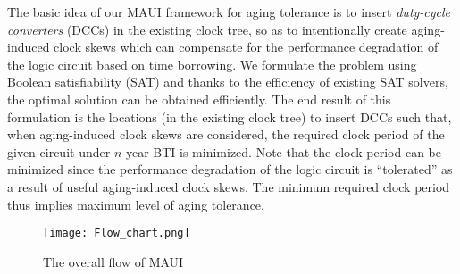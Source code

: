 The basic idea of our MAUI framework for aging tolerance is to insert \textit{duty-cycle converters} (DCCs) in the existing clock tree, so as to intentionally create aging-induced clock skews which can compensate for the performance degradation of the logic circuit based on time borrowing. We formulate the problem using Boolean satisfiability (SAT) and thanks to the efficiency of existing SAT solvers, the optimal solution can be obtained efficiently. The end result of this formulation is the locations (in the existing clock tree) to insert DCCs such that, when aging-induced clock skews are considered, the required clock period of the given circuit under $n$-year BTI is minimized. Note that the clock period can be minimized since the performance degradation of the logic circuit is \enquote{tolerated} as a result of useful aging-induced clock skews. The minimum required clock period thus implies maximum level of aging tolerance.


\begin{figure}
	\centering
	\texttt{[image: Flow\_chart.png]}
	\caption{The overall flow of MAUI}
	\label{fig:flow}
\end{figure}

\begin{comment}
The overall flow of our framework is depicted in Figure~\ref{fig:flow}, where a binary search for the minimum clock period ($T_c$) is involved. Formulated based on SAT, the key of our framework is to represent the problem in \textit{conjunctive normal form} (CNF). A CNF representation is a conjunction of one or more clauses, where each clause is a disjunction of one or more Boolean variables. In the sequel, Section~\ref{subsec:eddcd} explains how the proposed problem of DCC and technology leader deployment/insertion is encoded by Boolean variables. Section~\ref{subsec:dccccc} and Section~\ref{subsec:tccc} describe three major components, DCC constraints, HTV leader constraint and timing constraints, for our SAT-based formulation and how they are translated into legal SAT formula, i.e., CNF representation.
\end{comment}


